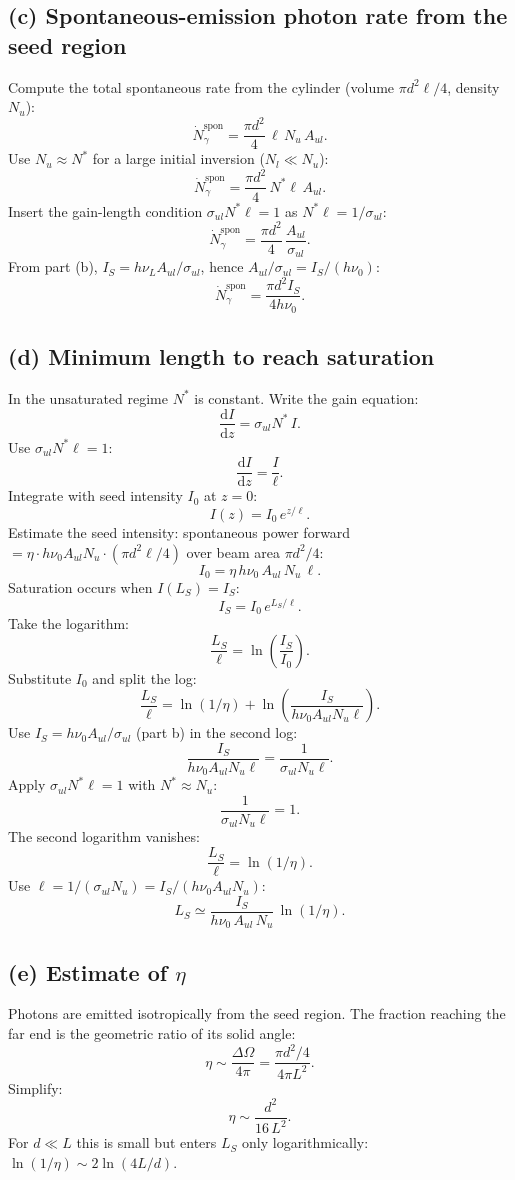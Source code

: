 \documentclass[11pt]{article}
\newcommand{\de}{\mathrm{d}}
\begin{document}
\subsection*{(c) Spontaneous-emission photon rate from the seed region}

Compute the total spontaneous rate from the cylinder (volume $\pi d^2\ell/4$, density $N_u$):
\[
\dot N_\gamma^\text{spon} = \frac{\pi d^2}{4}\,\ell\,N_u\,A_{ul}.
\]
Use $N_u\approx N^*$ for a large initial inversion ($N_l\ll N_u$):
\[
\dot N_\gamma^\text{spon} = \frac{\pi d^2}{4}\,N^*\ell\,A_{ul}.
\]
Insert the gain-length condition $\sigma_{ul}N^*\ell = 1$ as $N^*\ell = 1/\sigma_{ul}$:
\[
\dot N_\gamma^\text{spon} = \frac{\pi d^2}{4}\,\frac{A_{ul}}{\sigma_{ul}}.
\]
From part (b), $I_S = h\nu_L A_{ul}/\sigma_{ul}$, hence $A_{ul}/\sigma_{ul} = I_S/(h\nu_0)$:
\[
\boxed{\;\dot N_\gamma^\text{spon} = \frac{\pi d^2 I_S}{4 h\nu_0}.\;}
\]

\subsection*{(d) Minimum length to reach saturation}

In the unsaturated regime $N^*$ is constant. Write the gain equation:
\[
\frac{\de I}{\de z} = \sigma_{ul}N^*\,I.
\]
Use $\sigma_{ul}N^*\ell = 1$:
\[
\frac{\de I}{\de z} = \frac{I}{\ell}.
\]
Integrate with seed intensity $I_0$ at $z=0$:
\[
I(z) = I_0\,e^{z/\ell}.
\]
Estimate the seed intensity: spontaneous power forward $=\eta\cdot h\nu_0 A_{ul}N_u\cdot(\pi d^2\ell/4)$ over beam area $\pi d^2/4$:
\[
I_0 = \eta\,h\nu_0\,A_{ul}\,N_u\,\ell.
\]
Saturation occurs when $I(L_S)=I_S$:
\[
I_S = I_0\,e^{L_S/\ell}.
\]
Take the logarithm:
\[
\frac{L_S}{\ell} = \ln\!\left(\frac{I_S}{I_0}\right).
\]
Substitute $I_0$ and split the log:
\[
\frac{L_S}{\ell} = \ln(1/\eta) + \ln\!\left(\frac{I_S}{h\nu_0 A_{ul}N_u\ell}\right).
\]
Use $I_S = h\nu_0 A_{ul}/\sigma_{ul}$ (part b) in the second log:
\[
\frac{I_S}{h\nu_0 A_{ul}N_u\ell} = \frac{1}{\sigma_{ul}N_u\ell}.
\]
Apply $\sigma_{ul} N^*\ell=1$ with $N^*\approx N_u$:
\[
\frac{1}{\sigma_{ul}N_u\ell} = 1.
\]
The second logarithm vanishes:
\[
\frac{L_S}{\ell} = \ln(1/\eta).
\]
Use $\ell = 1/(\sigma_{ul}N_u) = I_S/(h\nu_0 A_{ul}N_u)$:
\[
\boxed{\;L_S \simeq \frac{I_S}{h\nu_0\,A_{ul}\,N_u}\,\ln(1/\eta).\;}
\]

\subsection*{(e) Estimate of $\eta$}

Photons are emitted isotropically from the seed region. The fraction reaching the far end is the geometric ratio of its solid angle:
\[
\eta \sim \frac{\Delta\Omega}{4\pi} = \frac{\pi d^2/4}{4\pi L^2}.
\]
Simplify:
\[
\boxed{\;\eta \sim \frac{d^2}{16\,L^2}.\;}
\]
For $d\ll L$ this is small but enters $L_S$ only logarithmically: $\ln(1/\eta)\sim 2\ln(4L/d)$.
\end{document}
